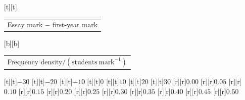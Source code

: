 %    
%
%
\begin{psfrags}%
\psfragscanon%
%
[t][t]{\color[rgb]{0,0,0}\setlength{\tabcolsep}{0pt}\begin{tabular}{c}\Large{}Essay mark $-$ first-year mark\end{tabular}}%
[b][b]{\color[rgb]{0,0,0}\setlength{\tabcolsep}{0pt}\begin{tabular}{c}\Large{}Frequency density$/(\mathrm{students\ mark^{-1}})$\end{tabular}}%
%
[t][t]{$-30$}%
[t][t]{$-20$}%
[t][t]{$-10$}%
[t][t]{$0$}%
[t][t]{$10$}%
[t][t]{$20$}%
[t][t]{$30$}%
%
[r][r]{$0.00$}%
[r][r]{$0.05$}%
[r][r]{$0.10$}%
[r][r]{$0.15$}%
[r][r]{$0.20$}%
[r][r]{$0.25$}%
[r][r]{$0.30$}%
[r][r]{$0.35$}%
[r][r]{$0.40$}%
[r][r]{$0.45$}%
[r][r]{$0.50$}%
%
%
\end{psfrags}%
%
